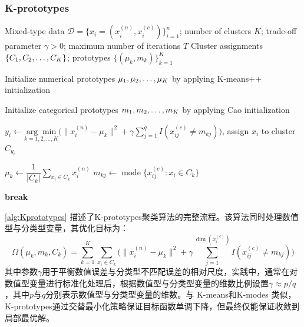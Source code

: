 \subsubsection{K-prototypes}
\begin{algorithm}[H]
	\caption{K-prototypes Clustering Algorithm}
	\label{alg:Kprototypes}
	\begin{algorithmic}[1]
		\Require Mixed-type data $\mathcal{D}=\{x_i=(x_i^{(n)},x_i^{(c)})\}_{i=1}^n$;
		number of clusters $K$;
		trade-off parameter $\gamma>0$;
		maximum number of iterations $T$
		\Ensure Cluster assignments $\{C_1, C_2, \dots, C_{K}\}$;
		prototypes $\{(\mu_k,m_k)\}_{k=1}^K$
		
		\State Initialize numerical prototypes $\mu_1, \mu_2, \dots, \mu_{K}$ 
		by applying K-means++ initialization
		
		\State Initialize categorical prototypes $m_1, m_2, \dots, m_{K}$
		by applying Cao initialization
		
		 
		\State $y_i \gets \underset{k=1,2,\dots,K}{\arg\min}
		\Big(
		\|x_i^{(n)}-\mu_k\|^2
		+
		\gamma\sum\limits_{j=1}^q I(x_{ij}^{(c)}\neq m_{kj})
		\Big)$, assign $x_i$ to cluster $C_{y_i}$
		\EndFor
		
		 
		\State $\mu_k \gets \dfrac{1}{|C_k|}
		\sum\limits_{x_i\in C_k} x_i^{(n)}$
		\State $m_{kj} \gets
		\operatorname{mode}\{x_{ij}^{(c)}:x_i\in C_k\}$
		\EndFor
		\EndFor
		
		\State \textbf{break}
		\EndIf
		\EndFor
	\end{algorithmic}
\end{algorithm}

\cref{alg:Kprototypes} 描述了K-prototypes聚类算法的完整流程。该算法同时处理数值型与分类型变量，其优化目标为：
\begin{equation*}
	\Omega({\mu_k,m_k},{C_k})=
	\sum_{k=1}^K\sum_{x_i\in C_k}
	\Big(\|x_i^{(n)}-\mu_k\|^2 + \gamma\sum_{j=1}^{\dim(x_i^{(c)})} I(x_{ij}^{(c)}\neq m_{kj})\Big)
\end{equation*}
其中参数$\gamma$用于平衡数值误差与分类型不匹配误差的相对尺度，实践中，通常在对数值型变量进行标准化处理后，根据数值型与分类型变量的维数比例设置$\gamma\approx p/q$，其中$p$与$q$分别表示数值型与分类型变量的维数。与 K-means和K-modes 类似，K-prototypes通过交替最小化策略保证目标函数单调下降，但最终仅能保证收敛到局部最优解。


